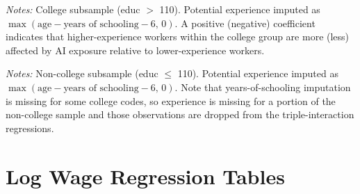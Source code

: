 \documentclass[11pt]{article}
\begin{document}
\begin{table}[H]
\begin{center}
\caption{Unemployment Table B --- college subsample. Dependent variable: binary unemployment indicator. Reported coefficients are on the triple interaction year $\times$ potential experience $\times$ AI exposure. Columns (1)--(3): no fixed effects, sex FE, sex + education FE. $F$-test $p$-value tests joint significance of the 2024 and 2025 triple-interaction terms. Standard errors clustered at the occupation level. $^{*}p<0.10$, $^{**}p<0.05$, $^{***}p<0.01$.}
\label{tab:unemp_B_col}
\resizebox{0.9\textwidth}{!}{}
\end{center}
\smallskip
\noindent\footnotesize\textit{Notes:} College subsample (educ $>$ 110). Potential experience imputed as $\max(\text{age} - \text{years of schooling} - 6,\, 0)$. A positive (negative) coefficient indicates that higher-experience workers within the college group are more (less) affected by AI exposure relative to lower-experience workers.
\end{table}

\begin{table}[H]
\begin{center}
\caption{Unemployment Table B --- non-college subsample. Dependent variable: binary unemployment indicator. Reported coefficients are on the triple interaction year $\times$ potential experience $\times$ AI exposure. Columns (1)--(3): no fixed effects, sex FE, sex + education FE. Standard errors clustered at the occupation level. $^{*}p<0.10$, $^{**}p<0.05$, $^{***}p<0.01$.}
\label{tab:unemp_B_noncol}
\resizebox{0.9\textwidth}{!}{}
\end{center}
\smallskip
\noindent\footnotesize\textit{Notes:} Non-college subsample (educ $\leq$ 110). Potential experience imputed as $\max(\text{age} - \text{years of schooling} - 6,\, 0)$. Note that years-of-schooling imputation is missing for some college codes, so experience is missing for a portion of the non-college sample and those observations are dropped from the triple-interaction regressions.
\end{table}

\clearpage

\section{Log Wage Regression Tables}
\end{document}
